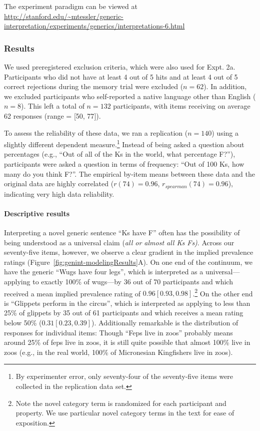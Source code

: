 \documentclass[floatsintext,man]{apa6}
\theoremstyle{definition}
\theoremstyle{definition}
\theoremstyle{definition}
\theoremstyle{remark}
\begin{document}
The experiment paradigm can be viewed at
\url{http://stanford.edu/~mtessler/generic-interpretation/experiments/generics/interpretations-6.html}

\subsubsection{Results}\label{results-2}

We used preregistered exclusion criteria, which were also used for Expt.
2a. Participants who did not have at least 4 out of 5 hits and at least
4 out of 5 correct rejections during the memory trial were excluded
(\(n = 62\)). In addition, we excluded participants who self-reported a
native language other than English (\(n = 8\)). This left a total of
\(n = 132\) participants, with items receiving on average 62 responses
(range = {[}50, 77{]}).

To assess the reliability of these data, we ran a replication
(\(n=140\)) using a slightly different dependent measure.\footnote{By
  experimenter error, only seventy-four of the seventy-five items were
  collected in the replication data set.} Instead of being asked a
question about percentages (e.g., \enquote{Out of all of the Ks in the
world, what percentage F?}), participants were asked a question in terms
of frequency: \enquote{Out of 100 Ks, how many do you think F?}. The
empirical by-item means between these data and the original data are
highly correlated (\(r(74) = 0.96\), \(r_{spearman}(74)= 0.96\)),
indicating very high data reliability.

\paragraph{Descriptive results}\label{descriptive-results}

Interpreting a novel generic sentence \enquote{Ks have F} often has the
possibility of being understood as a universal claim (\emph{all or
almost all Ks Fs)}. Across our seventy-five items, however, we observe a
clear gradient in the implied prevalence ratings
(Figure~\ref{fig:genint-modelingResults}A). On one end of the continuum,
we have the generic \enquote{Wugs have four legs}, which is interpreted
as a universal---applying to exactly 100\% of wugs---by 36 out of 70
participants and which received a mean implied prevalence rating of
\(0.96 [0.93, 0.98]\).\footnote{Note the novel category term is
  randomized for each participant and property. We use particular novel
  category terms in the text for ease of exposition.} On the other end
is \enquote{Glippets perform in the circus}, which is interpreted as
applying to less than 25\% of glippets by 35 out of 61 participants and
which receives a mean rating below 50\% (\(0.31 [0.23, 0.39]\)).
Additionally remarkable is the distribution of responses for individual
items: Though \enquote{Feps live in zoos} probably means around 25\% of
feps live in zoos, it is still quite possible that almost 100\% live in
zoos (e.g., in the real world, 100\% of Micronesian Kingfishers live in
zoos).
\end{document}
